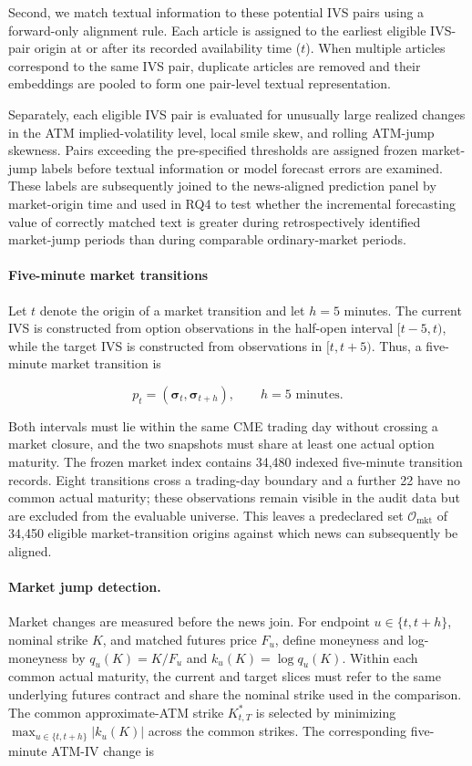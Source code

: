 Second, we match textual information to these potential IVS pairs using a forward-only alignment rule. Each article is assigned to the earliest eligible IVS-pair origin at or after its recorded availability time ($t$).  When multiple articles correspond to the same IVS pair, duplicate articles are removed and their embeddings are pooled to form one pair-level textual representation. 

Separately, each eligible IVS pair is evaluated for unusually large realized changes in the ATM implied-volatility level, local smile skew, and rolling ATM-jump skewness. Pairs exceeding the pre-specified thresholds are assigned frozen market-jump labels before textual information or model forecast errors are examined. These labels are subsequently joined to the news-aligned prediction panel by market-origin time and used in RQ4 to test whether the incremental forecasting value of correctly matched text is greater during retrospectively identified market-jump periods than during comparable ordinary-market periods.


 

\paragraph*{Five-minute market transitions}
Let $t$ denote the origin of a market transition and let $h=5$ minutes. The
current IVS is constructed from option observations in the half-open interval
$[t-5,t)$, while the target IVS is constructed from observations in
$[t,t+5)$. Thus, a five-minute market transition is

\begin{equation}\label{eq:ch3:five_minute_market_pair}
p_t
=
\left(
\boldsymbol{\sigma}_{t},
\boldsymbol{\sigma}_{t+h}
\right),
\qquad
h=5\text{ minutes}.
\end{equation}

Both intervals must lie within the same CME trading day without crossing a market closure, and
the two snapshots must share at least one actual option maturity. The frozen
market index contains 34,480 indexed five-minute transition records. Eight
transitions cross a trading-day boundary and a further 22 have no common actual
maturity; these observations remain visible in the audit data but are excluded
from the evaluable universe. This leaves a predeclared set
$\mathcal O_{\mathrm{mkt}}$ of 34,450 eligible market-transition origins
against which news can subsequently be aligned.


\paragraph*{Market jump detection.}
Market changes are measured before the news join. For endpoint
$u\in\{t,t+h\}$, nominal strike $K$, and matched futures price $F_u$, define
moneyness and log-moneyness by $q_u(K)=K/F_u$ and
$k_u(K)=\log q_u(K)$. Within each common actual maturity, the current and
target slices must refer to the same underlying futures contract and share the
nominal strike used in the comparison. The common approximate-ATM strike
$K^{*}_{t,T}$ is selected by minimizing
$\max_{u\in\{t,t+h\}}\lvert k_u(K)\rvert$ across the common strikes. The
corresponding five-minute ATM-IV change is

